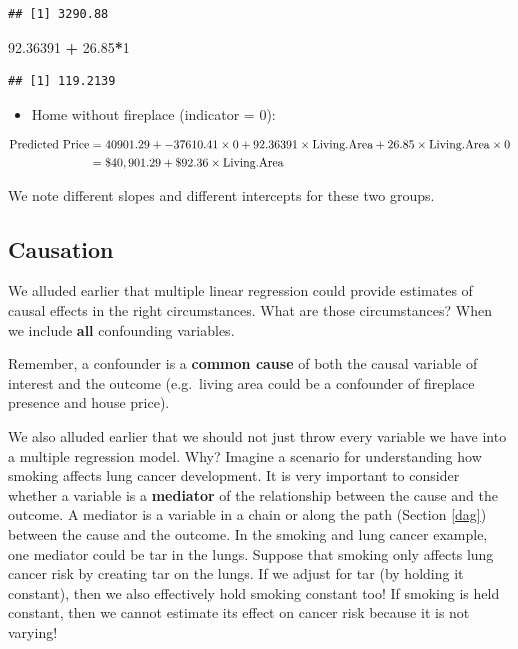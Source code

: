 \documentclass[]{book}
\newenvironment{Shaded}{\begin{snugshade}}{\end{snugshade}}
\newcommand{\DecValTok}[1]{\textcolor[rgb]{0.00,0.00,0.81}{#1}}
\newcommand{\FloatTok}[1]{\textcolor[rgb]{0.00,0.00,0.81}{#1}}
\newcommand{\OperatorTok}[1]{\textcolor[rgb]{0.81,0.36,0.00}{\textbf{#1}}}
\newcommand{\StringTok}[1]{\textcolor[rgb]{0.31,0.60,0.02}{#1}}
\providecommand{\tightlist}{%
  \setlength{\itemsep}{0pt}\setlength{\parskip}{0pt}}
\begin{document}
\begin{verbatim}
## [1] 3290.88
\end{verbatim}

\begin{Shaded}
\begin{Highlighting}[]
\FloatTok{92.36391} \OperatorTok{+}\StringTok{ }\FloatTok{26.85}\OperatorTok{*}\DecValTok{1}
\end{Highlighting}
\end{Shaded}

\begin{verbatim}
## [1] 119.2139
\end{verbatim}

\begin{itemize}
\tightlist
\item
  Home without fireplace (indicator = 0):
\end{itemize}

\begin{align*}
\hbox{Predicted Price} &= 40901.29 + -37610.41 \times 0 + 92.36391 \times \hbox{Living.Area} + 26.85 \times \hbox{Living.Area} \times 0 \\
&= \$40,901.29 + \$92.36 \times \hbox{Living.Area}
\end{align*}

We note different slopes and different intercepts for these two groups.

\hypertarget{causation}{%
\subsection{Causation}\label{causation}}

We alluded earlier that multiple linear regression could provide estimates of causal effects in the right circumstances. What are those circumstances? When we include \textbf{all} confounding variables.

Remember, a confounder is a \textbf{common cause} of both the causal variable of interest and the outcome (e.g.~living area could be a confounder of fireplace presence and house price).

We also alluded earlier that we should not just throw every variable we have into a multiple regression model. Why? Imagine a scenario for understanding how smoking affects lung cancer development. It is very important to consider whether a variable is a \textbf{mediator} of the relationship between the cause and the outcome. A mediator is a variable in a chain or along the path (Section \ref{dag}) between the cause and the outcome. In the smoking and lung cancer example, one mediator could be tar in the lungs. Suppose that smoking only affects lung cancer risk by creating tar on the lungs. If we adjust for tar (by holding it constant), then we also effectively hold smoking constant too! If smoking is held constant, then we cannot estimate its effect on cancer risk because it is not varying!
\end{document}
